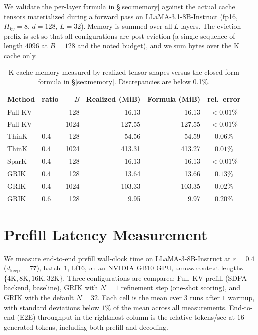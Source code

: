 \documentclass{article}
\begin{document}
We validate the per-layer formula in \S\ref{sec:memory} against the actual cache tensors materialized during a forward pass on LLaMA-3.1-8B-Instruct (fp16, $H_{kv}{=}8$, $d{=}128$, $L{=}32$). Memory is summed over all $L$ layers. The eviction prefix is set so that all configurations are post-eviction (a single sequence of length $4096$ at $B{=}128$ and the noted budget), and we sum bytes over the K cache only.
 
\begin{table}[h]
\centering
\small
\setlength{\tabcolsep}{6pt}
\renewcommand{\arraystretch}{1.15}
\caption{K-cache memory measured by realized tensor shapes versus the closed-form formula in \S\ref{sec:memory}. Discrepancies are below 0.1\%.}
\label{tab:memory-validation}
\begin{tabular}{@{}llrrrc@{}}
\toprule
\textbf{Method} & \textbf{ratio} & \textbf{$B$} & \textbf{Realized (MiB)} & \textbf{Formula (MiB)} & \textbf{rel.\ error} \\
\midrule
Full KV  & ---  &   128 &  16.13 &  16.13 & $<0.01\%$ \\
Full KV  & ---  &  1024 & 127.55 & 127.55 & $<0.01\%$ \\
ThinK    & 0.4  &   128 &  54.56 &  54.59 & $0.06\%$ \\
ThinK    & 0.4  &  1024 & 413.31 & 413.27 & $0.01\%$ \\
SparK    & 0.4  &   128 &  16.13 &  16.13 & $<0.01\%$ \\
GRIK     & 0.4  &   128 &  13.64 &  13.66 & $0.13\%$ \\
GRIK     & 0.4  &  1024 & 103.33 & 103.35 & $0.02\%$ \\
GRIK     & 0.6  &   128 &   9.95 &   9.97 & $0.20\%$ \\
\bottomrule
\end{tabular}
\end{table}
 
\section{Prefill Latency Measurement}
\label{app:prefill-latency}
 
We measure end-to-end prefill wall-clock time on LLaMA-3-8B-Instruct at $r{=}0.4$ ($d_{\text{keep}}{=}77$), batch~$1$, bf16, on an NVIDIA GB10 GPU, across context lengths $\{4\text{K}, 8\text{K}, 16\text{K}, 32\text{K}\}$. Three configurations are compared: Full~KV prefill (SDPA backend, baseline), GRIK with $N{=}1$ refinement step (one-shot scoring), and GRIK with the default $N{=}32$. Each cell is the mean over $3$ runs after $1$ warmup, with standard deviations below $1\%$ of the mean across all measurements. End-to-end (E2E) throughput in the rightmost column is the relative tokens/sec at $16$ generated tokens, including both prefill and decoding.
 
\end{document}
